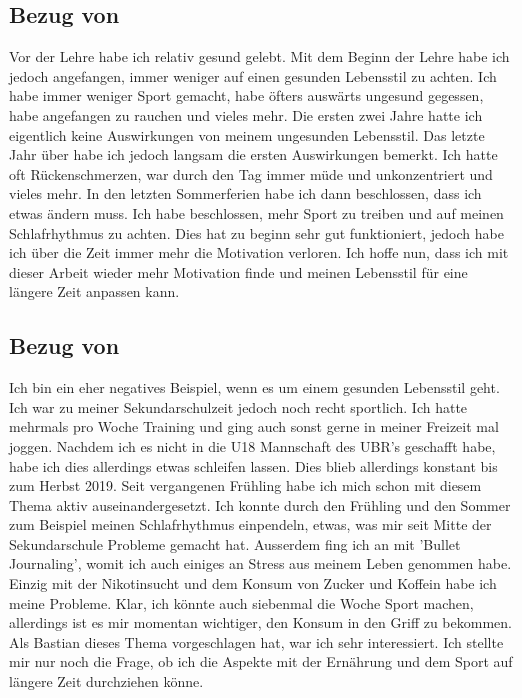 \subsection{Bezug von \dario}
\authortoc{\dario}{\subsectionident}
\label{bezug:dario}
Vor der Lehre habe ich relativ gesund gelebt. Mit dem Beginn der Lehre habe ich jedoch angefangen, immer weniger auf einen gesunden Lebensstil zu achten.
\newline
Ich habe immer weniger Sport gemacht, habe öfters auswärts ungesund gegessen, habe angefangen zu rauchen und vieles mehr. 
\newline
Die ersten zwei Jahre hatte ich eigentlich keine Auswirkungen von meinem ungesunden Lebensstil. 
\newline
Das letzte Jahr über habe ich jedoch langsam die ersten Auswirkungen bemerkt. Ich hatte oft Rückenschmerzen, war durch den Tag immer müde und unkonzentriert und vieles mehr.
\newline
In den letzten Sommerferien habe ich dann beschlossen, dass ich etwas ändern muss. Ich habe beschlossen, mehr Sport zu treiben und auf meinen Schlafrhythmus zu achten. 
\newline
Dies hat zu beginn sehr gut funktioniert, jedoch habe ich über die Zeit immer mehr die Motivation verloren.
\newline
Ich hoffe nun, dass ich mit dieser Arbeit wieder mehr Motivation finde und meinen Lebensstil für eine längere Zeit anpassen kann.
\subsection{Bezug von \jonas}
\authortoc{\jonas}{\subsectionident}
\label{bezug:jonas}
Ich bin ein eher negatives Beispiel, wenn es um einem gesunden Lebensstil geht. Ich war zu meiner Sekundarschulzeit jedoch noch recht sportlich. Ich hatte mehrmals pro Woche Training und ging auch sonst gerne in meiner Freizeit mal joggen. Nachdem ich es nicht in die U18 Mannschaft des UBR's geschafft habe, habe ich dies allerdings etwas schleifen lassen.
\newline
Dies blieb allerdings konstant bis zum Herbst 2019. Seit vergangenen Frühling habe ich mich schon mit diesem Thema aktiv auseinandergesetzt. Ich konnte durch den Frühling und den Sommer zum Beispiel meinen Schlafrhythmus einpendeln, etwas, was mir seit Mitte der Sekundarschule Probleme gemacht hat. Ausserdem fing ich an mit 'Bullet Journaling', womit ich auch einiges an Stress aus meinem Leben genommen habe. Einzig mit der Nikotinsucht und dem Konsum von Zucker und Koffein habe ich meine Probleme. Klar, ich könnte auch siebenmal die Woche Sport machen, allerdings ist es mir momentan wichtiger, den Konsum in den Griff zu bekommen.
\newline
\newline
Als Bastian dieses Thema vorgeschlagen hat, war ich sehr interessiert. Ich stellte mir nur noch die Frage, ob ich die Aspekte mit der Ernährung und dem Sport auf längere Zeit durchziehen könne.